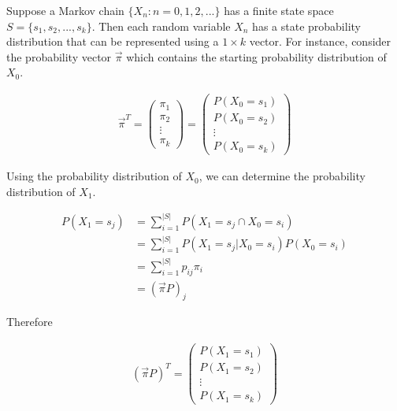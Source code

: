 \documentclass[a4paper, 12pt]{article}
\begin{document}
Suppose a Markov chain $\{X_n:n=0,1,2,...\}$ has a finite state space $S = \{s_1, s_2,..., s_k\}$. Then each random variable $X_n$ has a state probability distribution that can be represented using a $1 \times k$ vector. For instance, consider the probability vector $\vec{\pi}$ which contains the starting probability distribution of $X_0$.
	
	\begin{equation*}
	\begin{aligned}
		\vec{\pi}^T = \begin{pmatrix}
		 \pi_1 \\
		 \pi_2 \\ 
		 \vdots \\
		 \pi_k
		 \end{pmatrix} = \begin{pmatrix}
		 P(X_0 = s_1) \\
		 P(X_0 = s_2) \\ 
		 \vdots \\
		 P(X_0 = s_k)
		 \end{pmatrix}
	\end{aligned}
	\end{equation*}		
	
Using the probability distribution of $X_0$, we can determine the probability distribution of $X_1$.

	\begin{equation*}
	\begin{aligned}
		P(X_1 = s_j) &= \sum_{i=1}^{|S|} P(X_1 = s_j \cap X_0 = s_i) \\
				 	 &= \sum_{i=1}^{|S|} P(X_1 = s_j | X_0 = s_i)P(X_0 = s_i) \\
			     	 &= \sum_{i=1}^{|S|} p_{ij}\pi_i \\
			     	 &= (\vec{\pi}P)_j
	\end{aligned}
	\end{equation*}	
			     	 
	Therefore
	
	\begin{equation*}
	\begin{aligned}
		 (\vec{\pi}P)^T =
		 \begin{pmatrix}
		 P(X_1 = s_1) \\
		 P(X_1 = s_2) \\ 
		 \vdots \\
		 P(X_1 = s_k)
		 \end{pmatrix}
	\end{aligned}
	\end{equation*}
	
\end{document}

